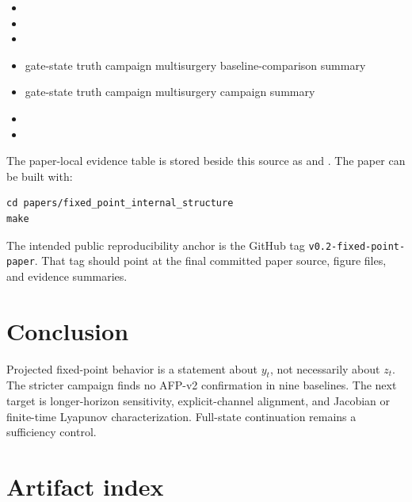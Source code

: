 \documentclass[11pt]{article}
\begin{document}
\begin{itemize}
  \item {}
  \item {}
  \item {}
  \item gate-state truth campaign multisurgery baseline-comparison summary
  \item gate-state truth campaign multisurgery campaign summary
  \item {}
  \item {}
\end{itemize}

The paper-local evidence table is stored beside this source as
 and . The paper can be
built with:

\begin{verbatim}
cd papers/fixed_point_internal_structure
make
\end{verbatim}

The intended public reproducibility anchor is the GitHub tag
\texttt{v0.2-fixed-point-paper}. That tag should point at the final committed
paper source, figure files, and evidence summaries.

\section{Conclusion}

Projected fixed-point behavior is a statement about $y_t$, not necessarily
about $z_t$. The stricter campaign finds no AFP-v2 confirmation in nine
baselines. The next target is longer-horizon sensitivity, explicit-channel
alignment, and Jacobian or finite-time Lyapunov characterization. Full-state
continuation remains a sufficiency control.

\appendix

\section{Artifact index}
\end{document}
